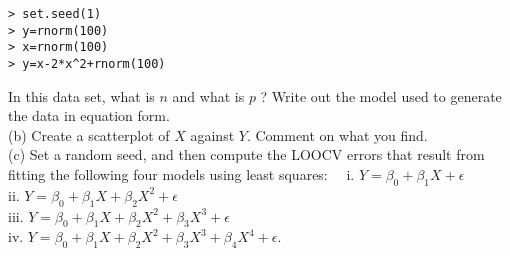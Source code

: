 \documentclass[10pt]{article}
\begin{document}
\begin{verbatim}
> set.seed(1)
> y=rnorm(100)
> x=rnorm(100)
> y=x-2*x^2+rnorm(100)
\end{verbatim}

In this data set, what is $n$ and what is $p$ ? Write out the model used to generate the data in equation form.\\
(b) Create a scatterplot of $X$ against $Y$. Comment on what you find.\\
(c) Set a random seed, and then compute the LOOCV errors that result from fitting the following four models using least squares:\
\
i. $Y=\beta_{0}+\beta_{1} X+\epsilon$\\
ii. $Y=\beta_{0}+\beta_{1} X+\beta_{2} X^{2}+\epsilon$\\
iii. $Y=\beta_{0}+\beta_{1} X+\beta_{2} X^{2}+\beta_{3} X^{3}+\epsilon$\\
iv. $Y=\beta_{0}+\beta_{1} X+\beta_{2} X^{2}+\beta_{3} X^{3}+\beta_{4} X^{4}+\epsilon$.
\end{document}
